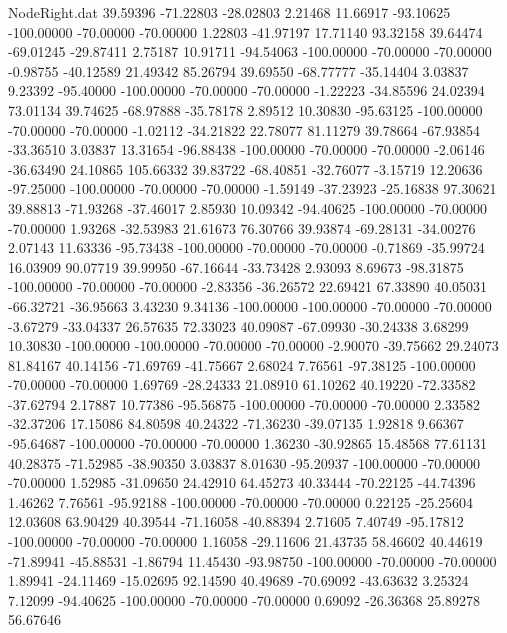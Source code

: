 \begin{filecontents}{NodeRight.dat}
  39.59396  -71.22803  -28.02803     2.21468   11.66917  -93.10625 -100.00000  -70.00000  -70.00000    1.22803  -41.97197   17.71140   93.32158
  39.64474  -69.01245  -29.87411     2.75187   10.91711  -94.54063 -100.00000  -70.00000  -70.00000   -0.98755  -40.12589   21.49342   85.26794
  39.69550  -68.77777  -35.14404     3.03837    9.23392  -95.40000 -100.00000  -70.00000  -70.00000   -1.22223  -34.85596   24.02394   73.01134
  39.74625  -68.97888  -35.78178     2.89512   10.30830  -95.63125 -100.00000  -70.00000  -70.00000   -1.02112  -34.21822   22.78077   81.11279
  39.78664  -67.93854  -33.36510     3.03837   13.31654  -96.88438 -100.00000  -70.00000  -70.00000   -2.06146  -36.63490   24.10865  105.66332
  39.83722  -68.40851  -32.76077    -3.15719   12.20636  -97.25000 -100.00000  -70.00000  -70.00000   -1.59149  -37.23923  -25.16838   97.30621
  39.88813  -71.93268  -37.46017     2.85930   10.09342  -94.40625 -100.00000  -70.00000  -70.00000    1.93268  -32.53983   21.61673   76.30766
  39.93874  -69.28131  -34.00276     2.07143   11.63336  -95.73438 -100.00000  -70.00000  -70.00000   -0.71869  -35.99724   16.03909   90.07719
  39.99950  -67.16644  -33.73428     2.93093    8.69673  -98.31875 -100.00000  -70.00000  -70.00000   -2.83356  -36.26572   22.69421   67.33890
  40.05031  -66.32721  -36.95663     3.43230    9.34136 -100.00000 -100.00000  -70.00000  -70.00000   -3.67279  -33.04337   26.57635   72.33023
  40.09087  -67.09930  -30.24338     3.68299   10.30830 -100.00000 -100.00000  -70.00000  -70.00000   -2.90070  -39.75662   29.24073   81.84167
  40.14156  -71.69769  -41.75667     2.68024    7.76561  -97.38125 -100.00000  -70.00000  -70.00000    1.69769  -28.24333   21.08910   61.10262
  40.19220  -72.33582  -37.62794     2.17887   10.77386  -95.56875 -100.00000  -70.00000  -70.00000    2.33582  -32.37206   17.15086   84.80598
  40.24322  -71.36230  -39.07135     1.92818    9.66367  -95.64687 -100.00000  -70.00000  -70.00000    1.36230  -30.92865   15.48568   77.61131
  40.28375  -71.52985  -38.90350     3.03837    8.01630  -95.20937 -100.00000  -70.00000  -70.00000    1.52985  -31.09650   24.42910   64.45273
  40.33444  -70.22125  -44.74396     1.46262    7.76561  -95.92188 -100.00000  -70.00000  -70.00000    0.22125  -25.25604   12.03608   63.90429
  40.39544  -71.16058  -40.88394     2.71605    7.40749  -95.17812 -100.00000  -70.00000  -70.00000    1.16058  -29.11606   21.43735   58.46602
  40.44619  -71.89941  -45.88531    -1.86794   11.45430  -93.98750 -100.00000  -70.00000  -70.00000    1.89941  -24.11469  -15.02695   92.14590
  40.49689  -70.69092  -43.63632     3.25324    7.12099  -94.40625 -100.00000  -70.00000  -70.00000    0.69092  -26.36368   25.89278   56.67646

\end{filecontents}
